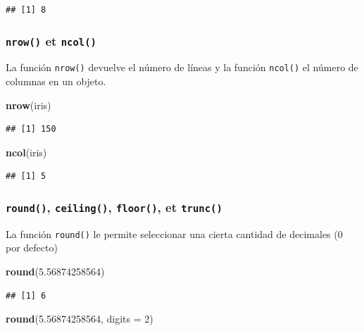 \documentclass[]{book}
\newenvironment{Shaded}{\begin{snugshade}}{\end{snugshade}}
\newcommand{\KeywordTok}[1]{\textcolor[rgb]{0.13,0.29,0.53}{\textbf{#1}}}
\newcommand{\DataTypeTok}[1]{\textcolor[rgb]{0.13,0.29,0.53}{#1}}
\newcommand{\DecValTok}[1]{\textcolor[rgb]{0.00,0.00,0.81}{#1}}
\newcommand{\FloatTok}[1]{\textcolor[rgb]{0.00,0.00,0.81}{#1}}
\newcommand{\NormalTok}[1]{#1}
\begin{document}
\begin{verbatim}
## [1] 8
\end{verbatim}

\subsubsection{\texorpdfstring{\texttt{nrow()} et
\texttt{ncol()}}{nrow() et ncol()}}\label{l015nrow}

La función \texttt{nrow()} devuelve el número de líneas y la función
\texttt{ncol()} el número de columnas en un objeto.

\begin{Shaded}
\begin{Highlighting}[]
\KeywordTok{nrow}\NormalTok{(iris)}
\end{Highlighting}
\end{Shaded}

\begin{verbatim}
## [1] 150
\end{verbatim}

\begin{Shaded}
\begin{Highlighting}[]
\KeywordTok{ncol}\NormalTok{(iris)}
\end{Highlighting}
\end{Shaded}

\begin{verbatim}
## [1] 5
\end{verbatim}

\subsubsection{\texorpdfstring{\texttt{round()}, \texttt{ceiling()},
\texttt{floor()}, et
\texttt{trunc()}}{round(), ceiling(), floor(), et trunc()}}\label{l015round}

La función \texttt{round()} le permite seleccionar una cierta cantidad
de decimales (0 por defecto)

\begin{Shaded}
\begin{Highlighting}[]
\KeywordTok{round}\NormalTok{(}\FloatTok{5.56874258564}\NormalTok{)}
\end{Highlighting}
\end{Shaded}

\begin{verbatim}
## [1] 6
\end{verbatim}

\begin{Shaded}
\begin{Highlighting}[]
\KeywordTok{round}\NormalTok{(}\FloatTok{5.56874258564}\NormalTok{, }\DataTypeTok{digits =} \DecValTok{2}\NormalTok{)}
\end{Highlighting}
\end{Shaded}
\end{document}
